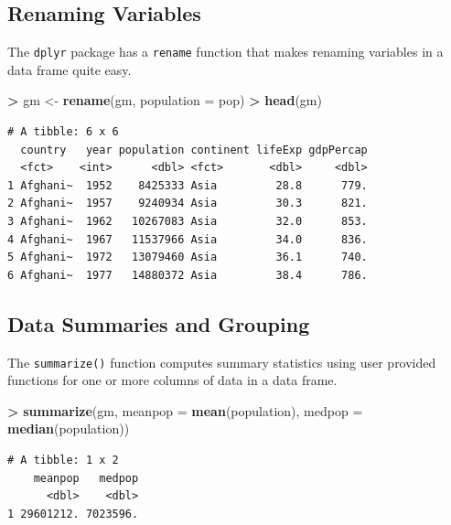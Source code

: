 \documentclass[]{krantz}
\makeatletter
\newenvironment{Shaded}{\begin{snugshade}}{\end{snugshade}}
\newcommand{\KeywordTok}[1]{\textcolor[rgb]{0.27,0.27,0.27}{\textbf{#1}}}
\newcommand{\DataTypeTok}[1]{\textcolor[rgb]{0.27,0.27,0.27}{#1}}
\newcommand{\StringTok}[1]{\textcolor[rgb]{0.5,0.5,0.5}{#1}}
\newcommand{\OperatorTok}[1]{\textcolor[rgb]{0.43,0.43,0.43}{\textbf{#1}}}
\newcommand{\NormalTok}[1]{#1}
\newenvironment{kframe}{%
\medskip{}
\setlength{\fboxsep}{.8em}
 \def\at@end@of@kframe{}%
 \ifinner\ifhmode%
  \def\at@end@of@kframe{\end{minipage}}%
  \begin{minipage}{\columnwidth}%
 \fi\fi%
 \def\FrameCommand##1{\hskip\@totalleftmargin \hskip-\fboxsep
 \colorbox{shadecolor}{##1}\hskip-\fboxsep
     \hskip-\linewidth \hskip-\@totalleftmargin \hskip\columnwidth}%
 \MakeFramed {\advance\hsize-\width
   \@totalleftmargin\z@ \linewidth\hsize
   \@setminipage}}%
 {\par\unskip\endMakeFramed%
 \at@end@of@kframe}
\renewenvironment{Shaded}{\begin{kframe}}{\end{kframe}}
\makeatother
\begin{document}
\subsection{Renaming Variables}\label{renaming-variables}

The \texttt{dplyr} package has a \texttt{rename} function that makes
renaming variables in a data frame quite easy.

\begin{Shaded}
\begin{Highlighting}[]
\OperatorTok{>}\StringTok{ }\NormalTok{gm <-}\StringTok{ }\KeywordTok{rename}\NormalTok{(gm, }\DataTypeTok{population =}\NormalTok{ pop)}
\OperatorTok{>}\StringTok{ }\KeywordTok{head}\NormalTok{(gm)}
\end{Highlighting}
\end{Shaded}

\begin{verbatim}
# A tibble: 6 x 6
  country   year population continent lifeExp gdpPercap
  <fct>    <int>      <dbl> <fct>       <dbl>     <dbl>
1 Afghani~  1952    8425333 Asia         28.8      779.
2 Afghani~  1957    9240934 Asia         30.3      821.
3 Afghani~  1962   10267083 Asia         32.0      853.
4 Afghani~  1967   11537966 Asia         34.0      836.
5 Afghani~  1972   13079460 Asia         36.1      740.
6 Afghani~  1977   14880372 Asia         38.4      786.
\end{verbatim}

\subsection{Data Summaries and
Grouping}\label{data-summaries-and-grouping}

The \texttt{summarize()} function computes summary statistics using user
provided functions for one or more columns of data in a data frame.

\begin{Shaded}
\begin{Highlighting}[]
\OperatorTok{>}\StringTok{ }\KeywordTok{summarize}\NormalTok{(gm, }\DataTypeTok{meanpop =} \KeywordTok{mean}\NormalTok{(population), }\DataTypeTok{medpop =} \KeywordTok{median}\NormalTok{(population))}
\end{Highlighting}
\end{Shaded}

\begin{verbatim}
# A tibble: 1 x 2
    meanpop   medpop
      <dbl>    <dbl>
1 29601212. 7023596.
\end{verbatim}
\end{document}
